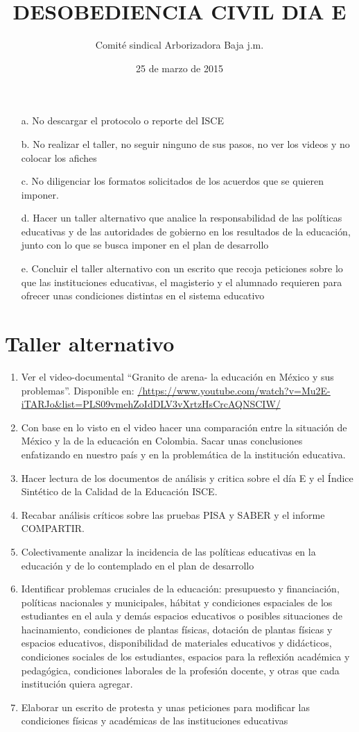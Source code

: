\documentclass[10pt]{article}
\author{Comité sindical Arborizadora Baja j.m.}
\title{DESOBEDIENCIA CIVIL DIA E}
\date{25 de marzo de 2015}
\begin{document}
\maketitle
\begin{itemize}
\item[a.] No descargar el protocolo o reporte del ISCE
\item[b.] No realizar el taller, no seguir ninguno de sus pasos, no ver los videos y no colocar los afiches
\item[c.] No diligenciar los formatos solicitados de los acuerdos que se quieren imponer.
\item[d.] Hacer un taller alternativo que analice la responsabilidad de las políticas educativas y de las autoridades de gobierno en los resultados de la educación, junto con lo que se busca imponer en el plan de desarrollo
\item[e.] Concluir el taller alternativo con un escrito que recoja peticiones sobre lo que las instituciones educativas, el magisterio y el alumnado requieren para ofrecer unas condiciones distintas en el sistema educativo
\end{itemize}
\section*{Taller alternativo}
\begin{enumerate}
\item Ver el video-documental “Granito de arena- la educación en México y sus problemas”. Disponible en: \url{/https://www.youtube.com/watch?v=Mu2E-iTARJo&list=PLS09vmehZoIdDLV3vXrtzHsCrcAQNSCIW/}
\item Con base en lo visto en el video hacer una comparación entre la situación de México y la de la educación en Colombia. Sacar unas conclusiones enfatizando en nuestro país y en la problemática de la institución educativa.
\item Hacer lectura de los documentos de análisis y critica sobre el día E y el Índice Sintético de la Calidad de la Educación ISCE.
\item Recabar análisis críticos sobre las pruebas PISA y SABER y el informe COMPARTIR.
\item Colectivamente analizar la incidencia de las políticas educativas en la educación y de lo contemplado en el plan de desarrollo
\item Identificar problemas cruciales de la educación: presupuesto y financiación, políticas nacionales y municipales, hábitat y condiciones espaciales de los estudiantes en el aula y demás espacios educativos o posibles situaciones de hacinamiento, condiciones de plantas físicas, dotación de plantas físicas y espacios educativos, disponibilidad de materiales educativos y didácticos, condiciones sociales de los estudiantes, espacios para la reflexión académica y pedagógica, condiciones laborales de la profesión docente, y otras que cada institución quiera agregar.
\item Elaborar un escrito de protesta y unas peticiones para modificar las condiciones físicas y académicas de las instituciones educativas
\end{enumerate}
\end{document}

